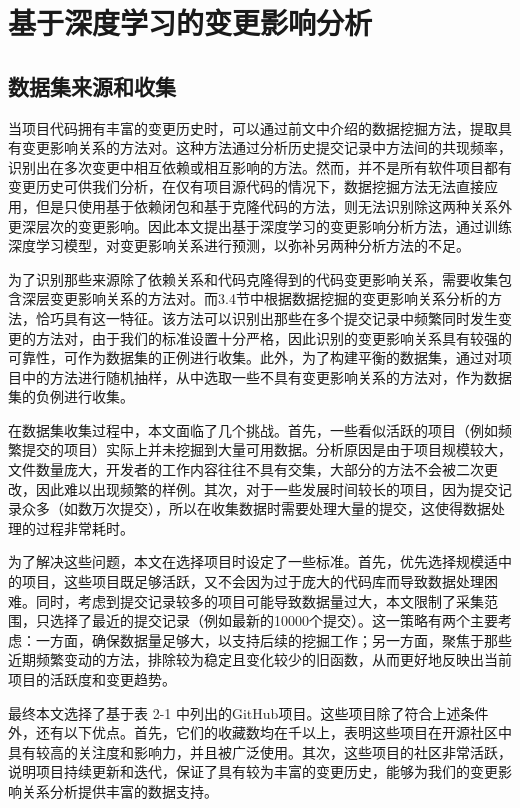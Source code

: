     



\section{基于深度学习的变更影响分析}

\subsection{数据集来源和收集}

当项目代码拥有丰富的变更历史时，可以通过前文中介绍的数据挖掘方法，提取具有变更影响关系的方法对。这种方法通过分析历史提交记录中方法间的共现频率，识别出在多次变更中相互依赖或相互影响的方法。然而，并不是所有软件项目都有变更历史可供我们分析，在仅有项目源代码的情况下，数据挖掘方法无法直接应用，但是只使用基于依赖闭包和基于克隆代码的方法，则无法识别除这两种关系外更深层次的变更影响。因此本文提出基于深度学习的变更影响分析方法，通过训练深度学习模型，对变更影响关系进行预测，以弥补另两种分析方法的不足。

为了识别那些来源除了依赖关系和代码克隆得到的代码变更影响关系，需要收集包含深层变更影响关系的方法对。而3.4节中根据数据挖掘的变更影响关系分析的方法，恰巧具有这一特征。该方法可以识别出那些在多个提交记录中频繁同时发生变更的方法对，由于我们的标准设置十分严格，因此识别的变更影响关系具有较强的可靠性，可作为数据集的正例进行收集。此外，为了构建平衡的数据集，通过对项目中的方法进行随机抽样，从中选取一些不具有变更影响关系的方法对，作为数据集的负例进行收集。

在数据集收集过程中，本文面临了几个挑战。首先，一些看似活跃的项目（例如频繁提交的项目）实际上并未挖掘到大量可用数据。分析原因是由于项目规模较大，文件数量庞大，开发者的工作内容往往不具有交集，大部分的方法不会被二次更改，因此难以出现频繁的样例。其次，对于一些发展时间较长的项目，因为提交记录众多（如数万次提交），所以在收集数据时需要处理大量的提交，这使得数据处理的过程非常耗时。

为了解决这些问题，本文在选择项目时设定了一些标准。首先，优先选择规模适中的项目，这些项目既足够活跃，又不会因为过于庞大的代码库而导致数据处理困难。同时，考虑到提交记录较多的项目可能导致数据量过大，本文限制了采集范围，只选择了最近的提交记录（例如最新的10000个提交）。这一策略有两个主要考虑：一方面，确保数据量足够大，以支持后续的挖掘工作；另一方面，聚焦于那些近期频繁变动的方法，排除较为稳定且变化较少的旧函数，从而更好地反映出当前项目的活跃度和变更趋势。

最终本文选择了基于表 2-1 中列出的GitHub项目。这些项目除了符合上述条件外，还有以下优点。首先，它们的收藏数均在千以上，表明这些项目在开源社区中具有较高的关注度和影响力，并且被广泛使用。其次，这些项目的社区非常活跃，说明项目持续更新和迭代，保证了具有较为丰富的变更历史，能够为我们的变更影响关系分析提供丰富的数据支持。

